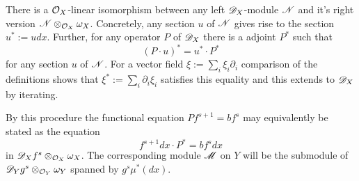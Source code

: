 There is a $\mathcal{O}_X$-linear isomorphism between any left $\mathscr{D}_X$-module $\mathscr{N}$ and it's right version $ \mathscr{N} \otimes_{\mathcal{O}_X}\omega_X$.
Concretely, any section $u$ of $\mathscr{N}$ gives rise to the section $u^* := u dx$.
Further, for any operator $P$ of $\mathscr{D}_X$ there is a adjoint $P^*$ such that
$$(P\cdot u)^* =   u^* \cdot P^*$$
for any section $u$ of $\mathscr{N}$.
For a vector field $\xi := \sum_i\xi_i \partial_i$ comparison of the definitions shows that $\xi^* := \sum_i\partial_i\xi_i$ satisfies this equality and this extends to $\mathscr{D}_X$ by iterating.

By this procedure the functional equation $P f^{s+1} = b f^s$ may equivalently be stated as the equation
$$f^{s+1}dx \cdot P^* = b f^s dx $$
in $\mathscr{D}_X f^s \otimes_{\mathcal{O}_X}\omega_X$.
The corresponding module $\mathscr{M}$ on $Y$ will be the submodule of $ \mathscr{D}_Y g^s \otimes_{\mathcal{O}_Y}\omega_Y$ spanned by $g^s \mu^*(dx)$.


